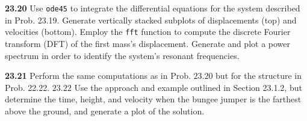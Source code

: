 \documentclass[../main.tex]{subfiles}
\begin{document}
\noindent \textbf{23.20} Use \texttt{ode45} to integrate the differential equations for the system described in Prob. 23.19. Generate vertically stacked subplots of displacements (top) and velocities (bottom). Employ the \texttt{fft} function to compute the discrete Fourier transform (DFT) of the first mass's displacement. Generate and plot a power spectrum in order to identify the system's resonant frequencies.\vspace{2mm}

\noindent \textbf{23.21} Perform the same computations as in Prob. $23.20$ but for the structure in Prob. 22.22.
$23.22$ Use the approach and example outlined in Section 23.1.2, but determine the time, height, and velocity when the bungee jumper is the farthest above the ground, and generate a plot of the solution.
\end{document}

